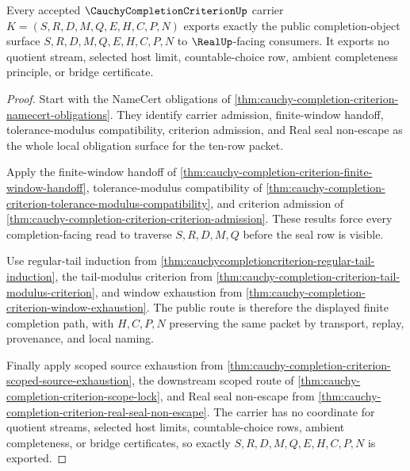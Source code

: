\begin{theorem}
\label{thm:cauchy-completion-criterion-public-export}
Every accepted $\CauchyCompletionCriterionUp$ carrier $K=(S,R,D,M,Q,E,H,C,P,N)$ exports exactly the public completion-object surface $S,R,D,M,Q,E,H,C,P,N$ to $\RealUp$-facing consumers. It exports no quotient stream, selected host limit, countable-choice row, ambient completeness principle, or bridge certificate.
\end{theorem}
\begin{proof}
Start with the NameCert obligations of \autoref{thm:cauchy-completion-criterion-namecert-obligations}. They identify carrier admission, finite-window handoff, tolerance-modulus compatibility, criterion admission, and Real seal non-escape as the whole local obligation surface for the ten-row packet.

Apply the finite-window handoff of \autoref{thm:cauchy-completion-criterion-finite-window-handoff}, tolerance-modulus compatibility of \autoref{thm:cauchy-completion-criterion-tolerance-modulus-compatibility}, and criterion admission of \autoref{thm:cauchy-completion-criterion-criterion-admission}. These results force every completion-facing read to traverse $S,R,D,M,Q$ before the seal row is visible.

Use regular-tail induction from \autoref{thm:cauchycompletioncriterion-regular-tail-induction}, the tail-modulus criterion from \autoref{thm:cauchy-completion-criterion-tail-modulus-criterion}, and window exhaustion from \autoref{thm:cauchy-completion-criterion-window-exhaustion}. The public route is therefore the displayed finite completion path, with $H,C,P,N$ preserving the same packet by transport, replay, provenance, and local naming.

Finally apply scoped source exhaustion from \autoref{thm:cauchy-completion-criterion-scoped-source-exhaustion}, the downstream scoped route of \autoref{thm:cauchy-completion-criterion-scope-lock}, and Real seal non-escape from \autoref{thm:cauchy-completion-criterion-real-seal-non-escape}. The carrier has no coordinate for quotient streams, selected host limits, countable-choice rows, ambient completeness, or bridge certificates, so exactly $S,R,D,M,Q,E,H,C,P,N$ is exported.
\end{proof}

